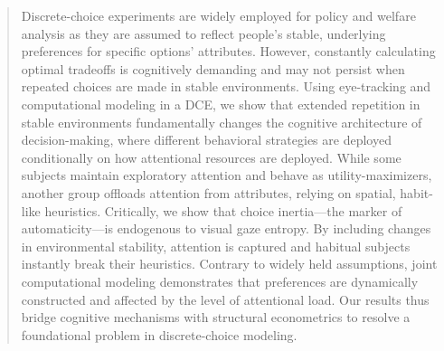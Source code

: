 \documentclass[9pt,twocolumn,twoside]{pnas-new}
\begin{document}

\begin{abstract}
Discrete-choice experiments are widely employed for policy and welfare analysis as they are assumed to reflect people's stable, underlying preferences for specific options' attributes. However, constantly calculating optimal tradeoffs is cognitively demanding and may not persist when repeated choices are made in stable environments. Using eye-tracking and computational modeling in a DCE, we show that extended repetition in stable environments fundamentally changes the cognitive architecture of decision-making, where different behavioral strategies are deployed conditionally on how attentional resources are deployed. While some subjects maintain exploratory attention and behave as utility-maximizers, another group offloads attention from attributes, relying on spatial, habit-like heuristics. Critically, we show that choice inertia---the marker of automaticity---is endogenous to visual gaze entropy. By including changes in environmental stability, attention is captured and habitual subjects instantly break their heuristics. Contrary to widely held assumptions, joint computational modeling demonstrates that preferences are dynamically constructed and affected by the level of attentional load. Our results thus bridge cognitive mechanisms with structural econometrics to resolve a foundational problem in discrete-choice modeling. 
\end{abstract}



\maketitle
\thispagestyle{firststyle}

\Firstpage







\matmethods{

}

\showmatmethods{} %

\dataavail{

}

\acknow{

}

\showacknow{} %


\end{document}
